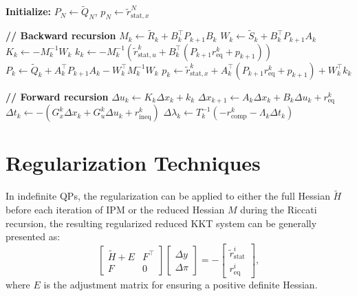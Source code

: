 \documentclass[conference]{IEEEtran}
\begin{document}
\begin{algorithm}[H]
\caption{Riccati Recursion for Solving OCP Structure QP}
\label{alg:riccati_recursion}
\begin{algorithmic}[1]
\State\textbf{Initialize:} $P_N \gets \tilde{Q}_N$, $p_N \gets \tilde{r}_{\mathrm{stat}, x}^N$

\Statex 
\Statex\textbf{// Backward recursion}
    \State $M_k \gets \tilde{R}_k + B_k^\top P_{k+1} B_k$
    \State $W_k \gets \tilde{S}_k + B_k^\top P_{k+1} A_k$
    \State $K_k \gets -M_k^{-1} W_k$
    \State $k_k \gets -M_k^{-1} \left(\tilde{r}_{\mathrm{stat}, u}^k + B_k^\top (P_{k+1} r_{\mathrm{eq}}^k + p_{k+1})\right)$
    \State $P_k \gets \tilde{Q}_k + A_k^\top P_{k+1} A_k - W_k^\top M_k^{-1} W_k$
    \State $p_k \gets \tilde{r}_{\mathrm{stat}, x}^k + A_k^\top (P_{k+1} r_{\mathrm{eq}}^k + p_{k+1}) + W_k^\top k_k$
\EndFor

\Statex
\Statex \textbf{// Forward recursion}
    \State $\Delta u_k \gets K_k \Delta x_k + k_k$
    \State $\Delta x_{k+1} \gets A_k \Delta x_k + B_k \Delta u_k + r_{\mathrm{eq}}^k$
    \State $\Delta t_k \gets -(G_{x}^k \Delta x_k + G_{u}^k \Delta u_k + r_{\mathrm{ineq}}^k)$
    \State $\Delta \lambda_k \gets T_k^{-1} (-r_{\mathrm{comp}}^k - \Lambda_k \Delta t_k)$
\EndFor
\end{algorithmic}
\end{algorithm}

\section{Regularization Techniques}
In indefinite QPs, the regularization can be applied to either the full Hessian $\tilde{H}$ before each iteration of IPM or the reduced Hessian $M$ during the Riccati recursion,
the resulting regularized reduced KKT system can be generally presented as:
\begin{equation}
    \begin{bmatrix}
     \tilde{H} + E & F^\top \\
    F & 0
    \end{bmatrix}
    \begin{bmatrix}
    \Delta y \\
    \Delta \pi
    \end{bmatrix} = -
    \begin{bmatrix}
    \tilde{r}_{\mathrm{stat}}^i \\
    r_{\mathrm{eq}}^i
    \end{bmatrix},
\end{equation}
where $E$ is the adjustment matrix for ensuring a positive definite Hessian.
\end{document}
